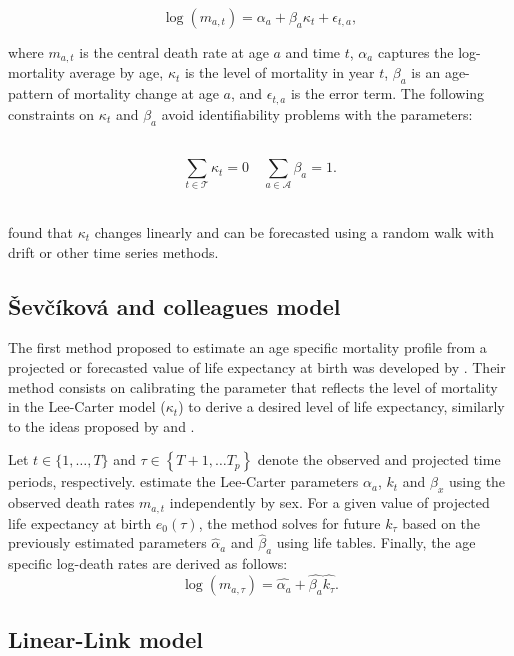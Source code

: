 \documentclass[a4,11pt]{article}
\begin{document}
	\begin{equation} 
	\label{eq.Lee-carter}
	\log{\left(m_{a,t}\right)}=\alpha_{a}+\beta_{a} \kappa_{t} + \epsilon_{t,a}, 
	\end{equation}
%

where $m_{a,t}$ is the central death rate at age $a$ and time $t$, $\alpha_{a}$ captures the log-mortality average by age, $\kappa_{t}$ is the level of mortality in year $t$, $\beta_{a}$ is an age-pattern of mortality change at age $a$, and $\epsilon_{t,a}$ is the error term. The following constraints on $\kappa_{t}$ and $\beta_{a}$ avoid identifiability problems with the parameters:

\,
$$\sum_{t \in \mathcal{T}}{\kappa_{t}}=0 \quad \sum_{a \in \mathcal{A}}{\beta_a}=1.$$
\,

\citet{LC1992} found that $\kappa_{t}$ changes linearly and can be forecasted using a random walk with drift or other time series methods.

\subsection{ \v{S}ev\v{c}\'{i}kov\'{a} and colleagues model}

The first method proposed to estimate an age specific mortality profile from a projected or forecasted value of life expectancy at birth was developed by \cite{Sevcikova}. Their method consists on calibrating the parameter that reflects the level of mortality in the Lee-Carter model ($\kappa_{t}$) to derive a desired level of life expectancy, similarly to the ideas proposed by \cite{lee01} and \cite{li2013}. 

Let $t \in\{1, \ldots, T\}$ and $\tau \in\left\{T+1, \ldots T_{p}\right\}$ denote the observed and projected time periods, respectively. \cite{Sevcikova} estimate the Lee-Carter parameters $\alpha_{a}$, $k_t$ and $\beta_{x}$ using the observed death rates $m_{a,t}$ independently by sex. For a given value of projected life expectancy at birth $e_{0}(\tau)$, the method solves for future $k_{\tau}$ based on the previously estimated parameters $\hat{\alpha}_{a}$ and $\hat{\beta}_{a}$ using life tables. Finally, the age specific log-death rates are derived as follows:
\begin{equation*} 
	\log{\left(m_{a,\tau}\right)}=\hat{\alpha_{a}}+\hat{\beta_{a}} \hat{k_{\tau}}.
\end{equation*}

\subsection{Linear-Link model}
\end{document}
